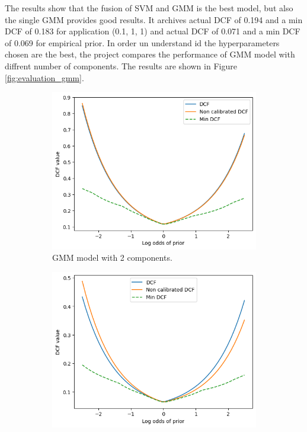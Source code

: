 \documentclass{article}
\begin{document}
The results show that the fusion of SVM and GMM is the best model, but also the single GMM provides good results. It archives actual DCF of 0.194 and a min DCF of 0.183 for application (0.1, 1, 1) and actual DCF of 0.071 and a min DCF of 0.069 for empirical prior. In order un understand id the hyperparameters chosen are the best, the project compares the performance of GMM model with diffrent number of components. The results are shown in Figure \ref{fig:evaluation_gmm}.

\begin{figure}[ht]
    \centering
    \begin{subfigure}[b]{0.45\textwidth}
        \centering
        \includegraphics[width=\textwidth]{images/evaluation_gmm_2.png}
        \caption{GMM model with 2 components.}
    \end{subfigure}
    \hfill
    \begin{subfigure}[b]{0.45\textwidth}
        \centering
        \includegraphics[width=\textwidth]{images/evaluation_gmm_4.png}

\end{subfigure}
\end{figure}
\end{document}
